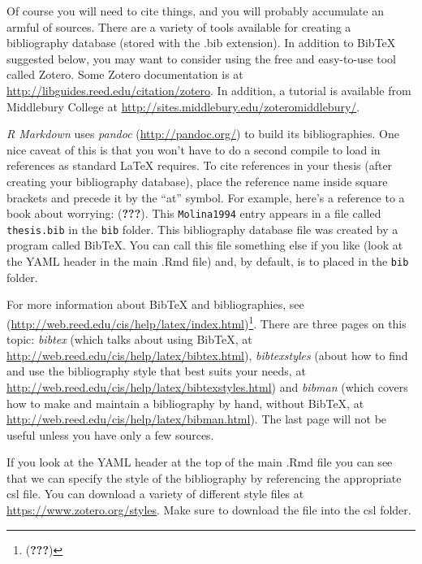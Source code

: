 \documentclass[ms]{uncgdissertationexp}
\theoremstyle{plain}
\theoremstyle{definition}
\theoremstyle{remark}
\begin{document}
  Of course you will need to cite things, and you will probably accumulate
  an armful of sources. There are a variety of tools available for
  creating a bibliography database (stored with the .bib extension). In
  addition to BibTeX suggested below, you may want to consider using the
  free and easy-to-use tool called Zotero. Some Zotero documentation is at
  \url{http://libguides.reed.edu/citation/zotero}. In addition, a tutorial
  is available from Middlebury College at
  \url{http://sites.middlebury.edu/zoteromiddlebury/}.
  
  \emph{R Markdown} uses \emph{pandoc} (\url{http://pandoc.org/}) to build
  its bibliographies. One nice caveat of this is that you won't have to do
  a second compile to load in references as standard LaTeX requires. To
  cite references in your thesis (after creating your bibliography
  database), place the reference name inside square brackets and precede
  it by the ``at'' symbol. For example, here's a reference to a book about
  worrying: ({\textbf{???}}). This \texttt{Molina1994} entry appears in a
  file called \texttt{thesis.bib} in the \texttt{bib} folder. This
  bibliography database file was created by a program called BibTeX. You
  can call this file something else if you like (look at the YAML header
  in the main .Rmd file) and, by default, is to placed in the \texttt{bib}
  folder.
  
  For more information about BibTeX and bibliographies, see
  (\url{http://web.reed.edu/cis/help/latex/index.html})\footnote{({\textbf{???}})}.
  There are three pages on this topic: \emph{bibtex} (which talks about
  using BibTeX, at \url{http://web.reed.edu/cis/help/latex/bibtex.html}),
  \emph{bibtexstyles} (about how to find and use the bibliography style
  that best suits your needs, at
  \url{http://web.reed.edu/cis/help/latex/bibtexstyles.html}) and
  \emph{bibman} (which covers how to make and maintain a bibliography by
  hand, without BibTeX, at
  \url{http://web.reed.edu/cis/help/latex/bibman.html}). The last page
  will not be useful unless you have only a few sources.
  
  If you look at the YAML header at the top of the main .Rmd file you can
  see that we can specify the style of the bibliography by referencing the
  appropriate csl file. You can download a variety of different style
  files at \url{https://www.zotero.org/styles}. Make sure to download the
  file into the csl folder.
  
\end{document}
